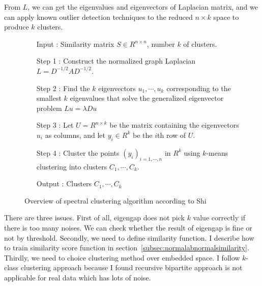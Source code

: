 From $L$, we can get the eigenvalues and eigenvectors of Laplacian matrix, and we can apply known outlier detection techniques \cite{knorr00} to the reduced $n \times k$ space to produce $k$ clusters. 
\begin{figure}[ht]
\begin{mdframed}
\begin{enumerate}
\item[Input] : Similarity matrix $S \in R^{n \times n}$, number $k$ of clusters. 
\item[Step 1] : Construct the normalized graph Laplacian $L = D^{-1/2} A D^{-1/2}$.
\item[Step 2] : Find the $k$ eigenvectors $u_1, \cdots, u_k$ corresponding to the smallest $k$ eigenvalues that solve the generalized eigenvector problem $L u = \lambda D u$ 
\item[Step 3] : Let $U = R^{n \times k}$ be the matrix containing the eigenvectors $u_i$ as columns, and let $y_i \in R^k$ be the $i$th row of $U$.
\item[Step 4] : Cluster the points $(y_i)_{i=1,\cdots,n}$ in $R^k$ using $k$-means clustering into clusters $C_1,\cdots,C_k$.
\item[Output] : Clusters $C_1, \cdots, C_k$
\end{enumerate}
\end{mdframed}
\caption{Overview of spectral clustering algorithm according to Shi}
\end{figure}

There are three issues. 
First of all, eigengap does not pick $k$ value correctly if there is too many noises. 
We can check whether the result of eigengap is fine or not by threshold. 
Secondly, we need to define similarity function. 
I describe how to train similarity score function in section~\ref{subsec:normalabnormalsimilarity}. 
Thirdly, we need to choice clustering method over embedded space. 
I follow $k$-class clustering approach because I found recursive bipartite approach is not applicable for real data which has lots of noise. 
